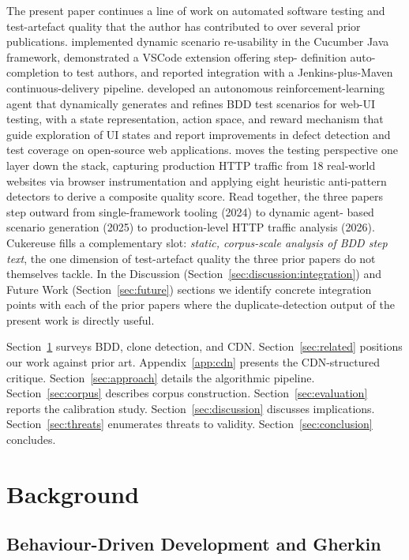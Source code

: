 \documentclass[11pt,a4paper]{article}
\begin{document}
The present paper continues a line of work on automated software
testing and test-artefact quality that the author has contributed
to over several prior publications. \citet{mughal2024bdd}
implemented dynamic scenario re-usability in the Cucumber
Java framework, demonstrated a VSCode extension offering step-
definition auto-completion to test authors, and reported
integration with a Jenkins-plus-Maven continuous-delivery
pipeline. \citet{mughal2025rlagent} developed an autonomous
reinforcement-learning agent that dynamically generates and
refines BDD test scenarios for web-UI testing, with a state
representation, action space, and reward mechanism that guide
exploration of UI states and report improvements in defect
detection and test coverage on open-source web applications.
\citet{mughal2026networklayer} moves the testing perspective
one layer down the stack, capturing production HTTP traffic
from 18 real-world websites via browser instrumentation and
applying eight heuristic anti-pattern detectors to derive a
composite quality score. Read together, the three papers step
outward from single-framework tooling (2024) to dynamic agent-
based scenario generation (2025) to production-level HTTP
traffic analysis (2026). Cukereuse fills a complementary slot:
\emph{static, corpus-scale analysis of BDD step text}, the one
dimension of test-artefact quality the three prior papers do
not themselves tackle. In the Discussion
(Section~\ref{sec:discussion:integration}) and Future Work
(Section~\ref{sec:future}) sections we identify concrete
integration points with each of the prior papers where the
duplicate-detection output of the present work is directly
useful.

Section~\ref{sec:background} surveys BDD, clone detection, and CDN.
Section~\ref{sec:related} positions our work against prior art.
Appendix~\ref{app:cdn} presents the CDN-structured critique.
Section~\ref{sec:approach} details the algorithmic pipeline.
Section~\ref{sec:corpus} describes corpus construction.
Section~\ref{sec:evaluation} reports the calibration study.
Section~\ref{sec:discussion} discusses implications.
Section~\ref{sec:threats} enumerates threats to validity.
Section~\ref{sec:conclusion} concludes.

\section{Background}
\label{sec:background}

\subsection{Behaviour-Driven Development and Gherkin}
\end{document}
